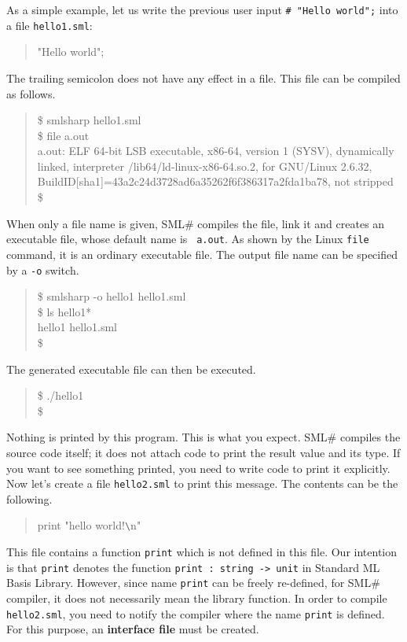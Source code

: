 \documentclass{jbook}
\newcommand{\smlsharp}{SML\#}
\newenvironment{program}{\begin{quote}\begin{tt}}%
                        {\end{tt}\end{quote}}
\begin{document}
	As a simple example, let us write the previous user input
{\tt \# "Hello world";} into a file {\tt hello1.sml}:
\begin{program}
"Hello world";
\end{program}
	The trailing semicolon does not have any effect in a file.
	This file can be compiled as follows.
\begin{program}
\$ smlsharp hello1.sml\\
\$ file a.out\\
a.out: ELF 64-bit LSB executable, x86-64,
version 1 (SYSV), dynamically linked,
interpreter /lib64/ld-linux-x86-64.so.2,
for GNU/Linux 2.6.32,
BuildID[sha1]=43a2c24d3728ad6a35262f6f386317a2fda1ba78,
not stripped\\
\$
\end{program}
	When only a file name is given, \smlsharp{} compiles the file,
link it and creates an executable file, whose default name is {\tt
a.out}.
	As shown by the Linux {\tt file} command, it is an ordinary
executable file.
	The output file name can be specified by a {\tt -o} switch.
\begin{program}
\$ smlsharp -o hello1 hello1.sml\\
\$ ls hello1*\\
hello1   hello1.sml\\
\$ 
\end{program}
	The generated executable file can then be executed.
\begin{program}
\$ ./hello1\\
\$ 
\end{program}
	Nothing is printed by this program.
	This is what you expect.
	\smlsharp{} compiles the source code itself; it does not attach
code to print the result value and its type.
	If you want to see something printed, you need to write code
to print it explicitly.
	Now let's create a file {\tt hello2.sml} to print this message.
	The contents can be the following.
\begin{program}
print "hello world!\verb|\|n"
\end{program}
	This file contains a function {\tt print} which is not defined
in this file.
	Our intention is that {\tt print} denotes the function
{\tt print : string -> unit} in Standard ML Basis Library.
	However, since name {\tt print} can be freely re-defined,
for \smlsharp{} compiler, it does not necessarily mean the library
function.
	In order to compile {\tt hello2.sml}, you need to notify the
compiler where the name {\tt print} is defined.
	For this purpose, an {\bf interface file} must be created.
\end{document}
